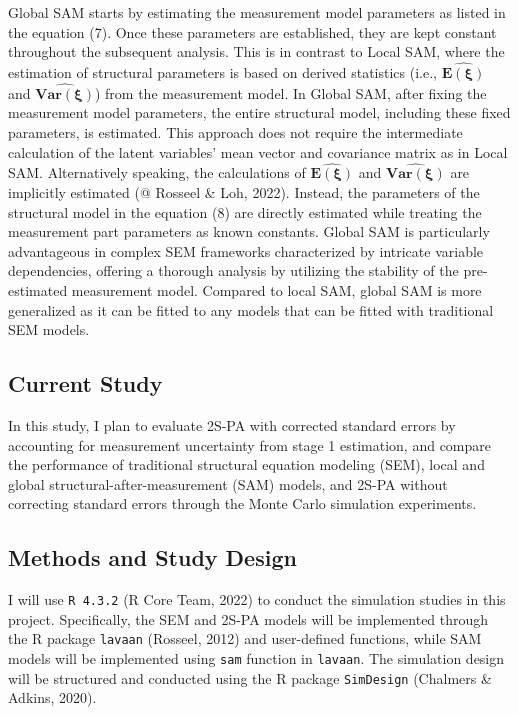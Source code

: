 \documentclass[
  man]{apa6}
\begin{document}
Global SAM starts by estimating the measurement model parameters as listed in the equation (7). Once these parameters are established, they are kept constant throughout the subsequent analysis. This is in contrast to Local SAM, where the estimation of structural parameters is based on derived statistics (i.e., \(\boldsymbol{\widehat{E(\boldsymbol{\xi})}}\) and \(\boldsymbol{\widehat{Var(\boldsymbol{\xi})}}\)) from the measurement model. In Global SAM, after fixing the measurement model parameters, the entire structural model, including these fixed parameters, is estimated. This approach does not require the intermediate calculation of the latent variables' mean vector and covariance matrix as in Local SAM. Alternatively speaking, the calculations of \(\boldsymbol{\widehat{E(\boldsymbol{\xi})}}\) and \(\boldsymbol{\widehat{Var(\boldsymbol{\xi})}}\) are implicitly estimated (@ Rosseel \& Loh, 2022). Instead, the parameters of the structural model in the equation (8) are directly estimated while treating the measurement part parameters as known constants. Global SAM is particularly advantageous in complex SEM frameworks characterized by intricate variable dependencies, offering a thorough analysis by utilizing the stability of the pre-estimated measurement model. Compared to local SAM, global SAM is more generalized as it can be fitted to any models that can be fitted with traditional SEM models.

\hypertarget{current-study}{%
\subsection{Current Study}\label{current-study}}

In this study, I plan to evaluate 2S-PA with corrected standard errors by accounting for measurement uncertainty from stage 1 estimation, and compare the performance of traditional structural equation modeling (SEM), local and global structural-after-measurement (SAM) models, and 2S-PA without correcting standard errors through the Monte Carlo simulation experiments.

\hypertarget{methods-and-study-design}{%
\subsection{Methods and Study Design}\label{methods-and-study-design}}

I will use \texttt{R\ 4.3.2} (R Core Team, 2022) to conduct the simulation studies in this project. Specifically, the SEM and 2S-PA models will be implemented through the R package \texttt{lavaan} (Rosseel, 2012) and user-defined functions, while SAM models will be implemented using \texttt{sam} function in \texttt{lavaan}. The simulation design will be structured and conducted using the R package \texttt{SimDesign} (Chalmers \& Adkins, 2020).
\end{document}
